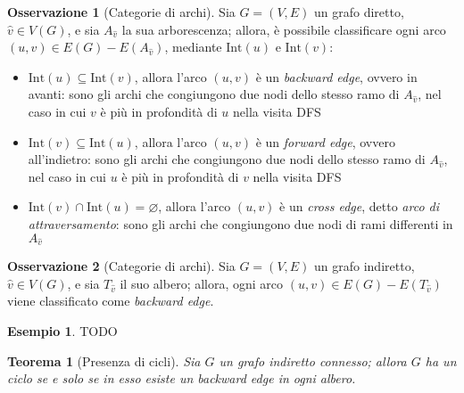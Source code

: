\documentclass[14pt]{extreport}
\newtheorem{theorem}{Teorema}[subsection]
\theoremstyle{definition}
\theoremstyle{definition}
\newtheorem{remark}{Osservazione}[subsection]
\newtheorem{example}{Esempio}[subsection]
\begin{document}
\begin{remark}[Categorie di archi]
    Sia $G= (V, E)$ un grafo diretto, $\hat v \in V(G)$, e sia $A_{\hat v}$ la sua arborescenza; allora, è possibile classificare ogni arco $(u, v) \in E(G) - E(A_{\hat v})$, mediante $\mathrm{Int}(u)$ e $\mathrm{Int}(v)$:
    \begin{itemize}
        \item $\mathrm{Int}(u) \subseteq \mathrm{Int}(v)$, allora l'arco $(u, v)$ è un \textit{backward edge}, ovvero in avanti: sono gli archi che congiungono due nodi dello stesso ramo di $A_{\hat v}$, nel caso in cui $v$ è più in profondità di $u$ nella visita DFS 
        \item $\mathrm{Int}(v) \subseteq \mathrm{Int}(u)$, allora l'arco $(u, v)$ è un \textit{forward edge}, ovvero all'indietro: sono gli archi che congiungono due nodi dello stesso ramo di $A_{\hat v}$, nel caso in cui $u$ è più in profondità di $v$ nella visita DFS
        \item $\mathrm{Int}(v) \cap \mathrm{Int}(u) = \varnothing$, allora l'arco $(u, v)$ è un \textit{cross edge}, detto \textit{arco di attraversamento}: sono gli archi che congiungono due nodi di rami differenti in $A_{\hat v}$
    \end{itemize}
\end{remark}

\begin{remark}[Categorie di archi]
    Sia $G=(V, E)$ un grafo indiretto, $\hat v \in V(G)$, e sia $T_{\hat v}$ il suo albero; allora, ogni arco $(u, v) \in E(G) - E(T_{\hat v})$ viene classificato come \textit{backward edge}.
\end{remark}

\begin{example}
    TODO
\end{example}

\begin{theorem}[Presenza di cicli]
    Sia $G$ un grafo indiretto connesso; allora $G$ ha un ciclo se e solo se in esso esiste un backward edge in ogni albero.
\end{theorem}
\end{document}
